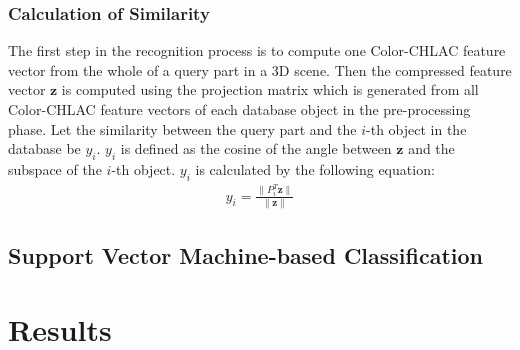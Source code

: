\documentclass[conference]{sty/IEEEtran}
\begin{document}
\subsubsection{Calculation of Similarity}
The first step in the recognition process is to compute 
    one Color-CHLAC feature vector from the whole of a query part in a 3D scene. %
Then the compressed feature vector $\bm{z}$ is computed using the projection matrix which is 
    generated from all Color-CHLAC feature vectors of each database object in the pre-processing phase.
Let the similarity between the query part and the $i$-th object in the database be $y_i$. 
$y_i$ is defined as the cosine of the angle between $\bm{z}$ and the subspace of the $i$-th object.
$y_i$ is calculated by the following equation: 
\begin{eqnarray}\label{eq:y_calc}
  y_i = \frac{\| P_i^T \bm{z} \|}{\| \bm{z} \|}
\end{eqnarray}


\subsection{Support Vector Machine-based Classification}


\section{Results}
\end{document}
